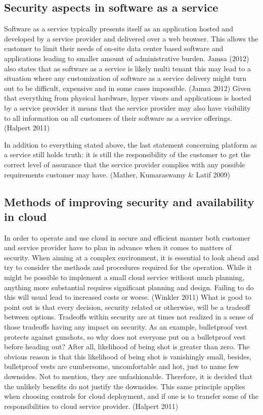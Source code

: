 \documentclass{article}
\begin{document}
\subsection{Security aspects in software as a service}
Software as a service typically presents itself as an application hosted and developed by a service provider and delivered over a web browser. This allows the customer to limit their needs of on-site data center based software and applications leading to smaller amount of administrative burden. Jamsa (2012) also states that as software as a service is likely multi tenant this may lead to a situation where any customization of software as a service delivery might turn out to be difficult, expensive and in some cases impossible. (Jamsa 2012)
Given that everything from physical hardware, hyper visors and applications is hosted by a service provider it means that the service provider may also have visibility to all information on all customers of their software as a service offerings. (Halpert 2011)
\par
In addition to everything stated above, the last statement concerning platform as a service still holds truth: it is still the responsibility of the customer to get the correct level of assurance that the service provider complies with any possible requirements customer may have. (Mather, Kumaraswamy \& Latif 2009)
\subsection{Methods of improving security and availability in cloud}
In order to operate and use cloud in secure and efficient manner both customer and service provider have to plan in advance when it comes to matters of security. When aiming at a complex environment, it is essential to look ahead and try to consider the methods and procedures required for the operation. While it might be possible to implement a small cloud service without much planning, anything more substantial requires significant planning and design. Failing to do this will usual lead to increased costs or worse. (Winkler 2011)
What is good to point out is that every decision, security related or otherwise, will be a tradeoff between options. Tradeoffs within security are at times not realized in a sense of those tradeoffs having any impact on security. As an example, bulletproof vest protects against gunshots, so why does not everyone put on a bulletproof vest before heading out? After all, likelihood of being shot is greater than zero. The obvious reason is that this likelihood of being shot is vanishingly small, besides, bulletproof vests are cumbersome, uncomfortable and hot, just to name few downsides. Not to mention, they are unfashionable. Therefore, it is decided that the unlikely benefits do not justify the downsides. This same principle applies when choosing controls for cloud deployment, and if one is to transfer some of the responsibilities to cloud service provider. (Halpert 2011)  
\end{document}
